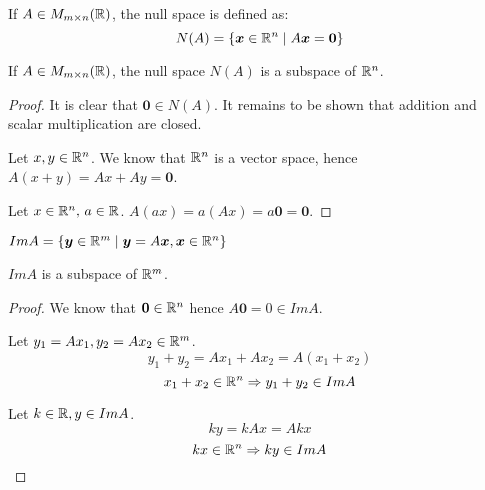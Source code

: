 \documentclass[a4paper,10pt]{article}
\begin{document}
\begin{defn}
	If $A \in M_{m \times n}(\mathbb{R})$, the null space is defined as:
	\[
		N(A) = \{ \bm{x} \in \mathbb{R}^n \mid A\bm{x} = \bm{0} \}
	\]
\end{defn}

\begin{prop}
	If $A \in M_{m \times n}(\mathbb{R})$, the null space $N(A)$ is a
	subspace of $\mathbb{R}^n$.
\end{prop}

\begin{proof}
	It is clear that $\bm{0} \in N(A)$. It remains to be shown
	that addition and scalar multiplication are closed.

	Let $x,y \in \mathbb{R}^n$. We know that $\mathbb{R}^n$ is a vector space,
	hence $A(x+y) = Ax + Ay = \bm{0}$.

	Let $x \in \mathbb{R}^n, \, a \in \mathbb{R}$. $A(ax) = a(Ax) = a\bm{0} = \bm{0}$.
\end{proof}

\begin{defn}
	$Im A = \{ \bm{y} \in \mathbb{R}^m \mid \bm{y} = A\bm{x}, \bm{x} \in \mathbb{R}^n \}$
\end{defn}

\begin{prop}
	$Im A$ is a subspace of $\mathbb{R}^m$.
\end{prop}

\begin{proof}
	We know that $\bm{0} \in \mathbb{R}^n$ hence $A\bm{0} = 0 \in Im A$.

	Let $y_1 = Ax_1, y_2 = Ax_2 \in \mathbb{R}^m$.
	\[
		y_1 + y_2 = Ax_1 + Ax_2 = A(x_1 + x_2)
	\]
	\[
		x_1 + x_2 \in \mathbb{R}^n \Rightarrow y_1 + y_2 \in Im A
	\]

	Let $k \in \mathbb{R}, y \in Im A$.
	\[
		ky = kAx = Akx
	\]
	\[
		kx \in \mathbb{R}^n \Rightarrow ky \in Im A
	\]
\end{proof}
\end{document}
